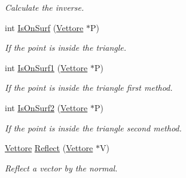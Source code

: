 \begin{DoxyCompactItemize}
\begin{DoxyCompactList}\small\item\em Calculate the inverse. \end{DoxyCompactList}\item 
int \hyperlink{classPiano_ad605fc62ded454a95190f42608532c64}{Is\+On\+Surf} (\hyperlink{classVettore}{Vettore} $\ast$P)\hypertarget{classPiano_ad605fc62ded454a95190f42608532c64}{}\label{classPiano_ad605fc62ded454a95190f42608532c64}

\begin{DoxyCompactList}\small\item\em If the point is inside the triangle. \end{DoxyCompactList}\item 
int \hyperlink{classPiano_a4e22ad7774b15806c2da88e9ee6f0bf5}{Is\+On\+Surf1} (\hyperlink{classVettore}{Vettore} $\ast$P)\hypertarget{classPiano_a4e22ad7774b15806c2da88e9ee6f0bf5}{}\label{classPiano_a4e22ad7774b15806c2da88e9ee6f0bf5}

\begin{DoxyCompactList}\small\item\em If the point is inside the triangle first method. \end{DoxyCompactList}\item 
int \hyperlink{classPiano_a4791ab5ce64e6a050c906d06d8f248ce}{Is\+On\+Surf2} (\hyperlink{classVettore}{Vettore} $\ast$P)\hypertarget{classPiano_a4791ab5ce64e6a050c906d06d8f248ce}{}\label{classPiano_a4791ab5ce64e6a050c906d06d8f248ce}

\begin{DoxyCompactList}\small\item\em If the point is inside the triangle second method. \end{DoxyCompactList}\item 
\hyperlink{classVettore}{Vettore} \hyperlink{classPiano_aaa1ed0db1c12ff7d0bbb4bfc5c4c7369}{Reflect} (\hyperlink{classVettore}{Vettore} $\ast$V)\hypertarget{classPiano_aaa1ed0db1c12ff7d0bbb4bfc5c4c7369}{}\label{classPiano_aaa1ed0db1c12ff7d0bbb4bfc5c4c7369}

\begin{DoxyCompactList}\small\item\em Reflect a vector by the normal. \end{DoxyCompactList}\end{DoxyCompactItemize}
